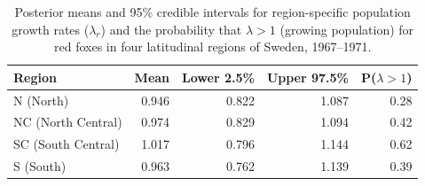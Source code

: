 
\begin{table}[!htbp]
  \centering
  \captionsetup{font=scriptsize}
  \caption{Posterior means and 95\% credible intervals for region-specific
    population growth rates ($\lambda_r$) and the probability that
    $\lambda > 1$ (growing population) for red foxes in four latitudinal
    regions of Sweden, 1967--1971.}
  \label{table:lambda}
  \scriptsize
  \begin{tabular}{lrrrr}
    \toprule
    Region             & Mean  & Lower 2.5\% & Upper 97.5\% & P($\lambda > 1$) \\
    \midrule
    N  (North)         & 0.946 & 0.822       & 1.087        & 0.28             \\
    NC (North Central) & 0.974 & 0.829       & 1.094        & 0.42             \\
    SC (South Central) & 1.017 & 0.796       & 1.144        & 0.62             \\
    S  (South)         & 0.963 & 0.762       & 1.139        & 0.39             \\
    \bottomrule
  \end{tabular}
\end{table}
